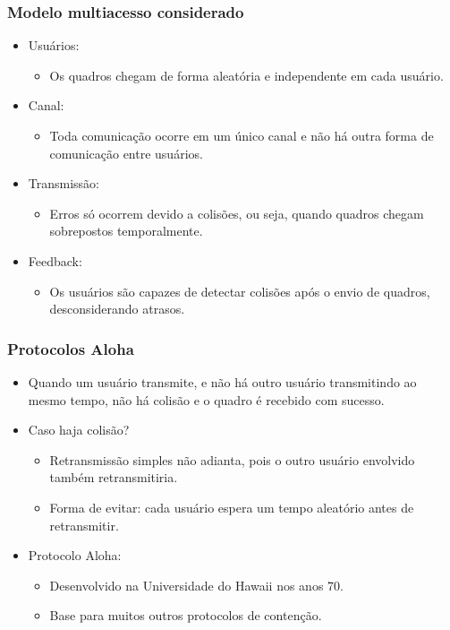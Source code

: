  \begin{frame}
	\frametitle{Modelo multiacesso considerado}

	\begin{itemize}
		\item Usuários:
		\begin{itemize}
			\item Os quadros chegam de forma aleatória e independente em cada usuário.
		\end{itemize}
		\item Canal:
		\begin{itemize}
			\item Toda comunicação ocorre em um único canal e não há outra forma de comunicação entre usuários.
		\end{itemize}
		\item Transmissão:
		\begin{itemize}
			\item Erros só ocorrem devido a colisões, ou seja, quando quadros chegam sobrepostos temporalmente.
		\end{itemize}
		\item Feedback:
		\begin{itemize}
			\item Os usuários são capazes de detectar colisões após o envio de quadros, desconsiderando atrasos.
		\end{itemize}
	\end{itemize}
\end{frame}

\begin{frame}
	\frametitle{Protocolos Aloha}

	\begin{itemize}
		\item Quando um usuário transmite, e não há outro usuário transmitindo ao mesmo tempo, não há colisão e o quadro é recebido com sucesso.
		\item Caso haja colisão?
		\begin{itemize}
			\item Retransmissão simples não adianta, pois o outro usuário envolvido também retransmitiria.
			\item Forma de evitar: cada usuário espera um tempo aleatório antes de retransmitir.
		\end{itemize}
		\item Protocolo Aloha:
		\begin{itemize}
			\item Desenvolvido na Universidade do Hawaii nos anos 70.
			\item Base para muitos outros protocolos de contenção.
		\end{itemize}
	\end{itemize}
\end{frame}

